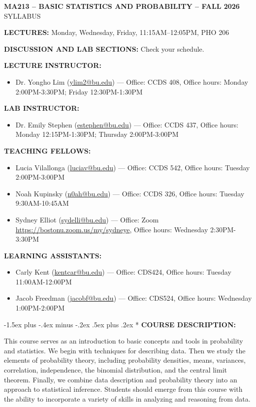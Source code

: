 \documentclass[11pt]{article}
\makeatletter
\renewcommand\section{\@startsection{section}{1}{0pt}%
  {-1.5ex plus -.4ex minus -.2ex}%
  {.5ex plus .2ex}%
  {\normalfont\Large\bfseries}}
\makeatother
\begin{document}
\begin{center}{\large\textbf{MA213 -- BASIC STATISTICS AND PROBABILITY -- FALL 2026}}\\[2mm]
SYLLABUS\end{center}

\textbf{LECTURES:} Monday, Wednesday, Friday, 11:15AM--12:05PM, PHO 206

\textbf{DISCUSSION AND LAB SECTIONS:} Check your schedule.

\textbf{LECTURE INSTRUCTOR:}
\begin{itemize}
\item Dr. Yongho Lim (\href{mailto:ylim2@bu.edu}{ylim2@bu.edu}) --- Office: CCDS 408, Office hours: Monday 2:00PM-3:30PM; Friday 12:30PM-1:30PM
\end{itemize}
\textbf{LAB INSTRUCTOR:}
\begin{itemize}
\item Dr. Emily Stephen (\href{mailto:estephen@bu.edu}{estephen@bu.edu}) --- Office: CCDS 437, Office hours: Monday 12:15PM-1:30PM; Thursday 2:00PM-3:00PM
\end{itemize}
\textbf{TEACHING FELLOWS:}
\begin{itemize}
\item Lucia Vilallonga (\href{mailto:luciav@bu.edu}{luciav@bu.edu}) --- Office: CCDS 542, Office hours: Tuesday 2:00PM-3:00PM
\item Noah Kupinsky (\href{mailto:n0ah@bu.edu}{n0ah@bu.edu}) --- Office: CCDS 326, Office hours: Tuesday 9:30AM-10:45AM
\item Sydney Elliot (\href{mailto:sydelli@bu.edu}{sydelli@bu.edu}) --- Office: Zoom \url{https://bostonu.zoom.us/my/sydneye}, Office hours: Wednesday 2:30PM-3:30PM
\end{itemize}
\textbf{LEARNING ASSISTANTS:}
\begin{itemize}
\item Carly Kent (\href{mailto:kentcar@bu.edu}{kentcar@bu.edu}) --- Office: CDS424, Office hours: Tuesday 11:00AM-12:00PM
\item Jacob Freedman (\href{mailto:jacobf@bu.edu}{jacobf@bu.edu}) --- Office: CDS524, Office hours: Wednesday 1:00PM-2:00PM
\end{itemize}

\section*{}
\textbf{COURSE DESCRIPTION:}

This course serves as an introduction to basic concepts and tools in probability and statistics. We begin with techniques for describing data. Then we study the elements of probability theory, including probability densities, means, variances, correlation, independence, the binomial distribution, and the central limit theorem. Finally, we combine data description and probability theory into an approach to statistical inference. Students should emerge from this course with the ability to incorporate a variety of skills in analyzing and reasoning from data.
\end{document}
